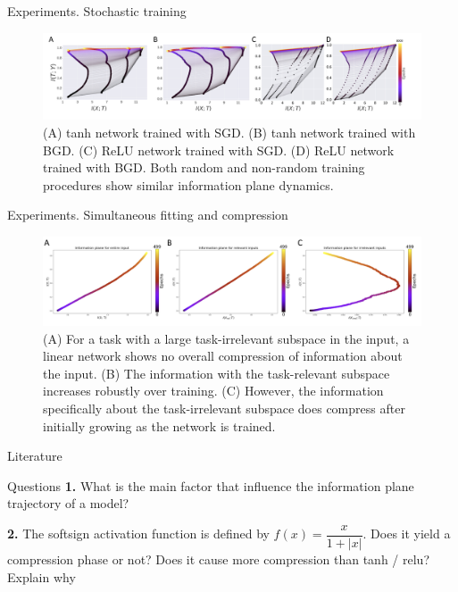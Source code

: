 \documentclass[13pt]{beamer}				\usepackage{graphicx}
\begin{document}
\begin{frame}{Experiments. Stochastic training}
\begin{figure}[h!]
    \includegraphics[width=1\textwidth, trim={0 0 0 0cm},clip]{images/InfB5.jpg}
    \caption{(A) tanh network trained with SGD. (B) tanh
network trained with BGD. (C) ReLU network trained with SGD. (D) ReLU network trained with
BGD. Both random and non-random training procedures show similar information plane dynamics.}
\end{figure}
\end{frame}

\begin{frame}{Experiments. Simultaneous fitting and compression}
\begin{figure}[h!]
    \includegraphics[width=1\textwidth, trim={0 0 0 0cm},clip]{images/InfB6.jpg}
    \caption{(A) For a task with a large task-irrelevant subspace
in the input, a linear network shows no overall compression of information about the input. (B)
The information with the task-relevant subspace increases robustly over training. (C) However, the
information specifically about the task-irrelevant subspace does compress after initially growing as
the network is trained.}
\end{figure}
\end{frame}

\begin{frame}{Literature}
\nocite{michael2018on}
\printbibliography
\end{frame}

\begin{frame}{Questions}
\textbf{1.} What is the main factor that influence the information plane trajectory of a model?

\textbf{2.} The softsign activation function is defined by $f(x) = \dfrac{x}{1 + |x|}$. Does it yield a compression phase or not? Does it cause more compression than tanh / relu? Explain why

\end{frame}
\end{document}
